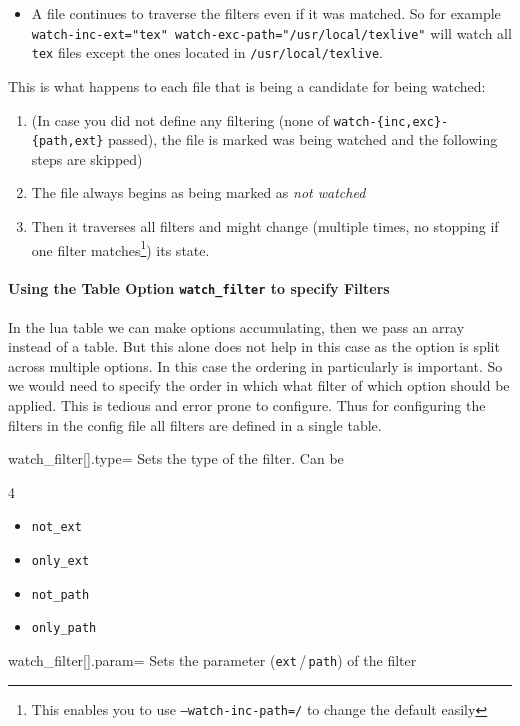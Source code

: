\documentclass[a4paper, 11pt]{scrartcl}
\begin{document}
\begin{itemize}
	\item[Note:] A file continues to traverse the filters even if it was matched.
		So for example \texttt{watch-inc-ext="tex" watch-exc-path="/usr/local/texlive"} will watch all \texttt{tex} files except the ones located in \texttt{/usr/local/texlive}.
\end{itemize}

This is what happens to each file that is being a candidate for being watched:
\begin{enumerate}
	\item (In case you did not define any filtering (none of \texttt{watch-\{inc,exc\}-\{path,ext\}} passed), the file is marked was being watched and the following steps are skipped)
	\item The file always begins as being marked as \emph{not watched}
	\item Then it traverses all filters and might change (multiple times, no stopping if one filter matches\footnote{
		This enables you to use \texttt{--watch-inc-path=/} to change the default easily
	}) its state.
\end{enumerate}

\paragraph{Using the Table Option \texttt{watch\_filter} to specify Filters}
In the lua table we can make options accumulating, then we pass an array instead of a table.
But this alone does not help in this case as the option is split across multiple options.
In this case the ordering in particularly is important.
So we would need to specify the order in which what filter of which option should be applied.
This is tedious and error prone to configure.
Thus for configuring the filters in the config file all filters are defined in a single table.

\begin{docKey}[config][
	]{watch_filter[].type}{=}{}
	Sets the type of the filter. Can be
	\begin{multicols}{4}
		\begin{itemize}
			\item \texttt{not\_ext}
			\item \texttt{only\_ext}
			\item \texttt{not\_path}
			\item \texttt{only\_path}
		\end{itemize}
	\end{multicols}
\end{docKey}
\begin{docKey}[config][
	]{watch_filter[].param}{=}{}
	Sets the parameter (\texttt{ext}\,/\,\texttt{path}) of the filter
\end{docKey}
\end{document}
